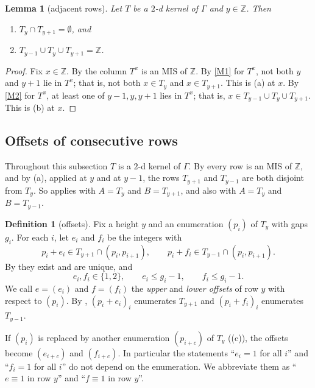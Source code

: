 \documentclass[11pt]{article}
\theoremstyle{plain}
\newtheorem{lemma}[lemma]{Lemma}
\theoremstyle{definition}
\newtheorem{definition}[definition]{Definition}
\theoremstyle{remark}
\newcommand{\Z}{\mathbb{Z}}
\begin{document}
\begin{lemma}[adjacent rows]\label{lem:adjacent-rows}
Let $T$ be a $2$-d kernel of $\Gamma$ and $y \in \Z$. Then
\begin{enumerate}[label=(\alph*)]
  \item $T_y \cap T_{y+1} = \emptyset$, and
  \item $T_{y-1} \cup T_y \cup T_{y+1} = \Z$.
\end{enumerate}
\end{lemma}

\begin{proof}
Fix $x \in \Z$. By  the column $T^x$ is an MIS of $\Z$. By \ref{M1} for $T^x$,
not both $y$ and $y+1$ lie in $T^x$; that is, not both $x \in T_y$ and $x \in T_{y+1}$. This
is (a) at $x$. By \ref{M2} for $T^x$, at least one of $y-1, y, y+1$ lies in $T^x$; that is,
$x \in T_{y-1} \cup T_y \cup T_{y+1}$. This is (b) at $x$.
\end{proof}

\subsection{Offsets of consecutive rows}

Throughout this subsection $T$ is a $2$-d kernel of $\Gamma$. By  every row is
an MIS of $\Z$, and by (a), applied at $y$ and at $y-1$, the rows
$T_{y+1}$ and $T_{y-1}$ are both disjoint from $T_y$. So  applies with
$A = T_y$ and $B = T_{y+1}$, and also with $A = T_y$ and $B = T_{y-1}$.

\begin{definition}[offsets]\label{def:offsets}
Fix a height $y$ and an enumeration $(p_i)$ of $T_y$ with gaps $g_i$. For each $i$, let
$e_i$ and $f_i$ be the integers with
\[
p_i + e_i \in T_{y+1} \cap (p_i, p_{i+1}), \qquad p_i + f_i \in T_{y-1} \cap (p_i, p_{i+1}).
\]
By  they exist and are unique, and
\begin{equation}\label{eq:offset-bounds}
e_i, f_i \in \{1, 2\}, \qquad e_i \le g_i - 1, \qquad f_i \le g_i - 1 .
\end{equation}
We call $e = (e_i)$ and $f = (f_i)$ the \emph{upper} and \emph{lower offsets} of row $y$
with respect to $(p_i)$. By , $(p_i + e_i)_i$ enumerates $T_{y+1}$ and
$(p_i + f_i)_i$ enumerates $T_{y-1}$.
\end{definition}

If $(p_i)$ is replaced by another enumeration $(p_{i+c})$ of $T_y$ ((c)), the
offsets become $(e_{i+c})$ and $(f_{i+c})$. In particular the statements ``$e_i = 1$ for all
$i$'' and ``$f_i = 1$ for all $i$'' do not depend on the enumeration. We abbreviate them as
``$e \equiv 1$ in row $y$'' and ``$f \equiv 1$ in row $y$''.
\end{document}
